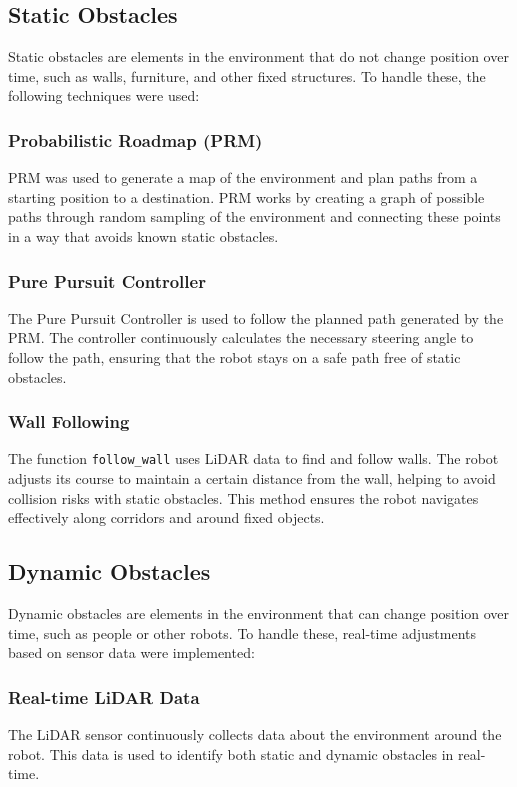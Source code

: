 \documentclass{article}
\begin{document}
	\subsection{Static Obstacles}
	Static obstacles are elements in the environment that do not change position over time, such as walls, furniture, and other fixed structures. To handle these, the following techniques were used:
	
	\subsubsection{Probabilistic Roadmap (PRM)}
	PRM was used to generate a map of the environment and plan paths from a starting position to a destination. PRM works by creating a graph of possible paths through random sampling of the environment and connecting these points in a way that avoids known static obstacles.
	
	\subsubsection{Pure Pursuit Controller}
	The Pure Pursuit Controller is used to follow the planned path generated by the PRM. The controller continuously calculates the necessary steering angle to follow the path, ensuring that the robot stays on a safe path free of static obstacles.
	
	\subsubsection{Wall Following}
	The function \texttt{follow\_wall} uses LiDAR data to find and follow walls. The robot adjusts its course to maintain a certain distance from the wall, helping to avoid collision risks with static obstacles. This method ensures the robot navigates effectively along corridors and around fixed objects.
	
	\subsection{Dynamic Obstacles}
	Dynamic obstacles are elements in the environment that can change position over time, such as people or other robots. To handle these, real-time adjustments based on sensor data were implemented:
	
	\subsubsection{Real-time LiDAR Data}
	The LiDAR sensor continuously collects data about the environment around the robot. This data is used to identify both static and dynamic obstacles in real-time.
	
\end{document}
